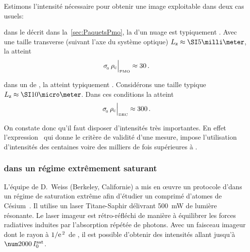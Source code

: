 {\label{an:ProfondeurOptiques}
Estimons l'intensité nécessaire pour obtenir une image exploitable dans deux cas usuels:
\begin{ditemize}
	\item dans le \pmo décrit dans la~\autoref{sec:PaquetsPmo},  la \dat d'un nuage est typiquement . Avec une taille transverse (suivant l'axe du système optique) $\LZnuage\approx\mm{5}$, la \pro atteint  
\[
\AvecTexte{\seceff \, \denscol}{\tiny PMO} \approx 30
\pointformule
\]
\item dans un \bec de \rb, la \dat atteint typiquement . Considérons une taille typique $\LZnuage\approx\micron{10}$. Dans ces conditions la \pro atteint  
\[
\AvecTexte{\seceff \, \denscol}{\tiny BEC} \approx 300
\pointformule
\]
\end{ditemize}
On constate donc qu'il faut disposer d'intensités très importantes. En effet l'expression~ qui donne le critère de validité d'une mesure, impose l'utilisation d'intensités des centaines voire des milliers de fois supérieures à \lintsat.
}

\casse 

\subsubsection{\Ipf dans un régime extrêmement saturant}
L'équipe de D.~Weiss (Berkeley, Californie) a mis en \oe uvre un protocole d'\ipf dans un régime de saturation extrême  afin d'étudier un \pmo comprimé d'atomes de Césium~\cite{DLH00}. Il utilise un laser Titane-Saphir délivrant \SI{500}{\milli\watt} de lumière résonante. Le laser imageur est rétro-réfléchi de manière à équilibrer les forces radiatives induites par l'absorption répétée de photons. Avec un faisceau imageur dont le rayon à ${{1} / {\mathrm{e}^{\left.2\right.}}}$ de , il est possible d'obtenir des intensités allant jusqu'à $\val{2000} \, \Isat$. 

